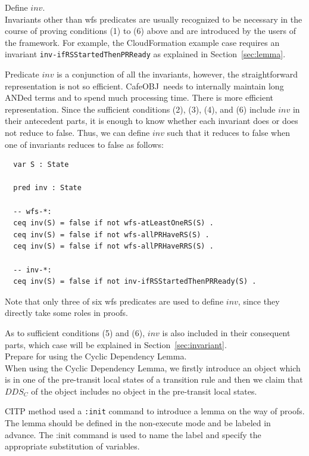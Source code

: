 \documentclass[12pt]{report}
\newcommand{\cafeobj}{{\sf CafeOBJ}~}
\begin{document}
 Define $inv$. \\ Invariants other than wfs
predicates are usually recognized to be necessary in the course of
proving conditions (1) to (6) above and are introduced by the users of
the framework. For example, the CloudFormation example case requires
an invariant {\tt inv-ifRSStartedThenPRReady} as explained in
Section~\ref{sec:lemma}.

Predicate $inv$ is a conjunction of all the invariants, however, the
straightforward representation is not so efficient. \cafeobj needs to
internally maintain long ANDed terms and to spend much processing
time. There is more efficient representation. Since the sufficient
conditions (2), (3), (4), and (6) include $inv$ in their antecedent
parts, it is enough to know whether each invariant does or does not
reduce to false. Thus, we can define $inv$ such that it reduces to
false when one of invariants reduces to false as follows:
\begin{verbatim}
  var S : State

  pred inv : State

  -- wfs-*:
  ceq inv(S) = false if not wfs-atLeastOneRS(S) .
  ceq inv(S) = false if not wfs-allPRHaveRS(S) .
  ceq inv(S) = false if not wfs-allPRHaveRRS(S) .

  -- inv-*:
  ceq inv(S) = false if not inv-ifRSStartedThenPRReady(S) .
\end{verbatim}
Note that only three of six wfs predicates are used to define $inv$,
since they directly take some roles in proofs.

As to sufficient conditions (5) and (6), $inv$ is also included in
their consequent parts, which case will be explained in
Section~\ref{sec:invariant}.\\

 Prepare for using the Cyclic Dependency
Lemma. \\ When using the Cyclic Dependency Lemma, we firstly introduce
an object which is in one of the pre-transit local states of a
transition rule and then we claim that $DDS_C$ of the object includes
no object in the pre-transit local states.

CITP method used a {\tt :init} command to introduce a lemma on the way
of proofs.  The lemma should be defined in the non-execute mode and be
labeled in advance. The :init command is used to name the label and
specify the appropriate substitution of variables.
\end{document}
